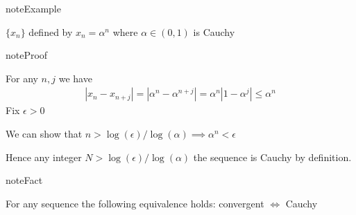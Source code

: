 \documentclass[letterpaper,10pt,english]{jupyterBook}
\begin{document}
\begin{sphinxadmonition}{note}{Example}

\sphinxAtStartPar
\(\{x_n\}\) defined by \(x_n = \alpha^n\) where \(\alpha \in
(0, 1)\) is Cauchy
\end{sphinxadmonition}

\begin{sphinxadmonition}{note}{Proof}

\sphinxAtStartPar
For any \(n , j\) we have
\begin{equation*}
\begin{split}
|x_n - x_{n+j}|
= |\alpha^n - \alpha^{n+j}| 
= \alpha^n |1 - \alpha^j|  \leq \alpha^n
\end{split}
\end{equation*}
\sphinxAtStartPar
Fix \(\epsilon > 0\)

\sphinxAtStartPar
We can show that \(n > \log(\epsilon) / \log(\alpha) \implies \alpha^n < \epsilon\)

\sphinxAtStartPar
Hence any integer \(N > \log(\epsilon) / \log(\alpha)\) the sequence is Cauchy by definition.
\end{sphinxadmonition}

\begin{sphinxadmonition}{note}{Fact}

\sphinxAtStartPar
For any sequence the following equivalence holds: convergent \(\iff\) Cauchy
\end{sphinxadmonition}
\end{document}
